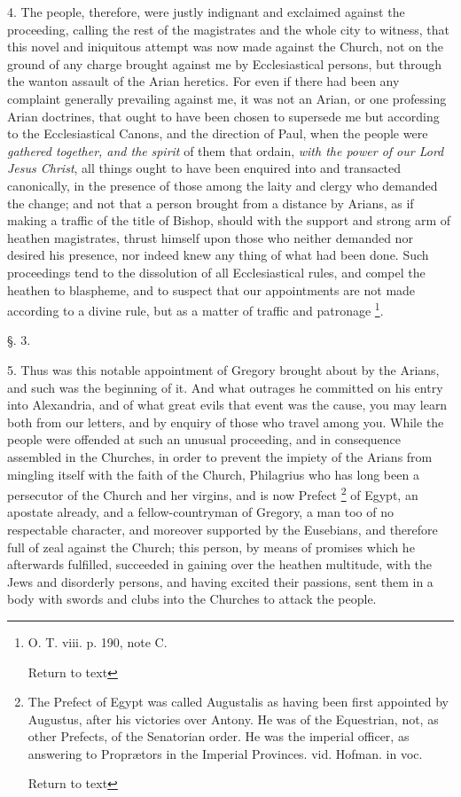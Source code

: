 4. The people, therefore, were justly indignant
and exclaimed against the proceeding, calling the rest of the
magistrates and the whole city to witness, that this novel and
iniquitous attempt was now made against the Church, not on the ground
of any charge brought against me by Ecclesiastical persons, but
through the wanton assault of the Arian heretics. For even if there
had been any complaint generally prevailing against me, it was not an
Arian, or one professing Arian doctrines, that ought to have been
chosen to supersede me but according to the Ecclesiastical Canons, and
the direction of Paul, when the people were \emph{gathered together, and
the} \emph{spirit} of them that ordain, \emph{with the power of
our Lord Jesus Christ}, all things ought to have been enquired into
and transacted canonically, in the presence of those among the laity
and clergy who demanded the change; and not that a person brought from
a distance by Arians, as if making a traffic of the title of Bishop,
should with the support and strong arm of heathen magistrates, thrust
himself upon those who neither demanded nor desired his presence, nor
indeed knew any thing of what had been done. Such proceedings tend to
the dissolution of all Ecclesiastical rules, and compel the heathen to
blaspheme, and to suspect that our appointments are not made according
to a divine rule, but as a matter of traffic and patronage \footnote{O. T. viii. p. 190, note C.

Return to text}.

§. 3.

5. Thus was this notable appointment of Gregory
brought about by the Arians, and such was the beginning of it. And
what outrages he committed on his entry into Alexandria, and of what
great evils that event was the cause, you may learn both from our
letters, and by enquiry of those who travel among you. While the
people were offended at such an unusual proceeding, and in consequence
assembled in the Churches, in order to prevent the impiety of the
Arians from mingling itself with the faith of the Church, Philagrius
who has long been a persecutor of the Church and her virgins, and is
now Prefect \footnote{The Prefect of Egypt was called Augustalis as having been first
appointed by Augustus, after his victories over Antony. He was of the
Equestrian, not, as other Prefects, of the Senatorian order. He was
the imperial officer, as answering to Proprætors in the Imperial
Provinces. vid. Hofman. in voc.

Return to text} of Egypt, an
apostate already, and a fellow-countryman of Gregory, a man too of no
respectable character, and moreover supported by the Eusebians, and
therefore full of zeal against the Church; this person, by means of
promises which he afterwards fulfilled, succeeded in gaining over the
heathen multitude, with the Jews and disorderly persons, and having
excited their passions, sent them in a body with swords and clubs into
the Churches to attack the people.

